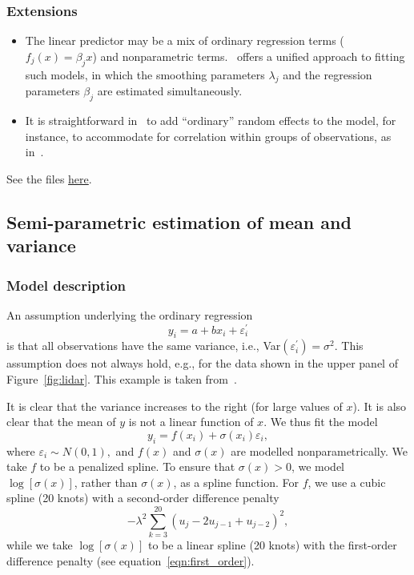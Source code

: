 \documentclass{admbmanual}
\newcommand{\citeasnoun}{\cite}
\begin{document}
\subsubsection{Extensions}

\begin{itemize}
  \item The linear predictor may be a mix of ordinary regression terms
  ($f_j(x)=\beta_jx$) and nonparametric terms. \scAR\ offers a unified
  approach to fitting such models, in which the smoothing parameters
  $\lambda_j$ and the regression parameters $\beta_j$ are estimated
  simultaneously.

  \item It is straightforward in \scAR\ to add ``ordinary'' random effects to
  the model, for instance, to accommodate for correlation within groups of
  observations, as in~\citeasnoun{lin:zhan:1999}.
\end{itemize}

See the files
\href{http://www.admb-project.org/otter-research/admbre/examples/union/union.html}{here}.

\subsection{Semi-parametric estimation of mean and variance}
\label{sec:lidar}

\subsubsection{Model description}
An assumption underlying the ordinary regression
\[
y_i=a+bx_i+\varepsilon_i^{\prime}
\]
is that all observations have the same variance, i.e.,
Var$\left(\varepsilon_i^{\prime}\right) =\sigma^2$. This assumption does
not always hold, e.g., for the data shown in the upper panel of
Figure~\ref{fig:lidar}. This example is taken
from~\citeasnoun{rupp:wand:carr:2003}.

It is clear that the variance increases to the right (for large values of $x$).
It is also clear that the mean of $y$ is not a linear function of $x$. We thus
fit the model
\[
y_i=f(x_i)+\sigma (x_i)\varepsilon_i,
\]
where $\varepsilon_i\sim N(0,1),$ and $f(x)$ and $\sigma (x)$ are modelled
nonparametrically. We take $f$ to be a penalized spline. To ensure that $\sigma
(x)>0$, we model $\log \left[ \sigma (x)\right] $, rather than $\sigma (x)$, as
a spline function. For $f$, we use a cubic spline (20 knots) with a second-order
difference penalty%
\[
-\lambda^2\sum_{k=3}^{20}\left(u_j-2u_{j-1}+u_{j-2}\right)^2,
\]
while we take $\log \left[ \sigma (x)\right]$ to be a linear spline (20 knots)
with the first-order difference penalty (see equation~\ref{eqn:first_order}).
\end{document}
